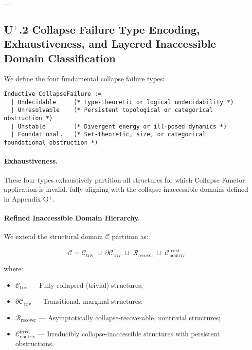 \documentclass[11pt]{article}
\begin{document}
---

\subsection*{U$^{+}$.2 Collapse Failure Type Encoding, Exhaustiveness, and Layered Inaccessible Domain Classification}

We define the four fundamental collapse failure types:

\begin{lstlisting}[language=Coq]
Inductive CollapseFailure :=
  | Undecidable     (* Type-theoretic or logical undecidability *)
  | Unresolvable    (* Persistent topological or categorical obstruction *)
  | Unstable        (* Divergent energy or ill-posed dynamics *)
  | Foundational.   (* Set-theoretic, size, or categorical foundational obstruction *)
\end{lstlisting}

\paragraph{Exhaustiveness.} These four types exhaustively partition all structures for which Collapse Functor application is invalid, fully aligning with the collapse-inaccessible domains defined in Appendix G$^{+}$.

\paragraph{Refined Inaccessible Domain Hierarchy.}

We extend the structural domain $\mathcal{C}$ partition as:

\[
\mathcal{C} = \mathcal{C}_{\mathrm{triv}} \;\sqcup\; \partial \mathcal{C}_{\mathrm{triv}} \;\sqcup\; \mathcal{R}_{\mathrm{recover}} \;\sqcup\; \mathcal{C}_{\mathrm{nontriv}}^{\mathrm{irred}}
\]

where:

\begin{itemize}
    \item $\mathcal{C}_{\mathrm{triv}}$ — Fully collapsed (trivial) structures;
    \item $\partial \mathcal{C}_{\mathrm{triv}}$ — Transitional, marginal structures;
    \item $\mathcal{R}_{\mathrm{recover}}$ — Asymptotically collapse-recoverable, nontrivial structures;
    \item $\mathcal{C}_{\mathrm{nontriv}}^{\mathrm{irred}}$ — Irreducibly collapse-inaccessible structures with persistent obstructions.
\end{itemize}
\end{document}
